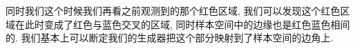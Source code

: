 \documentclass[lang=cn,11pt]{elegantpaper}
\begin{document}
同时我们这个时候我们再看之前观测到的那个红色区域, 我们可以发现这个红色区域在此时变成了红色与蓝色交叉的区域, 同时样本空间中的边缘也是红色蓝色相间的. 我们基本上可以断定我们的生成器把这个部分映射到了样本空间的边角上.

\nocite{*}



\end{document}
